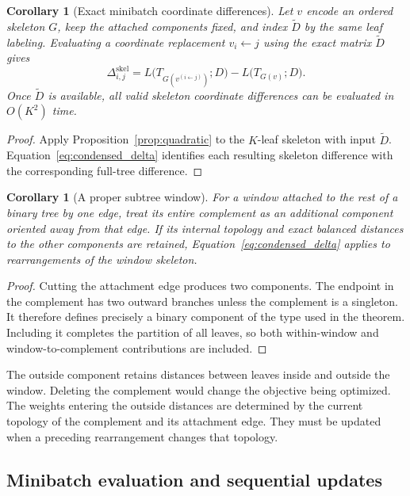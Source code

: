 \documentclass[11pt,a4paper]{article}
\makeatletter
\DeclareRobustCommand{\_}{\ifmmode\nfss@text{\textunderscore}\else\textunderscore\allowbreak\fi}
\newtheorem{corollary}[theorem]{Corollary}
\theoremstyle{definition}
\makeatother
\begin{document}
\begin{corollary}[Exact minibatch coordinate differences]
\label{cor:minibatch_gradient}
Let $v$ encode an ordered skeleton $G$, keep the attached components fixed, and index $\widetilde D$ by the same leaf labeling.
Evaluating a coordinate replacement $v_i\leftarrow j$ using the exact matrix $\widetilde D$ gives
\begin{equation}
 \Delta^{\mathrm{skel}}_{i,j}
 =L\bigl(T_{G(v^{(i\leftarrow j)})};D\bigr)
  -L\bigl(T_{G(v)};D\bigr).
 \label{eq:minibatch_gradient}
\end{equation}
Once $\widetilde D$ is available, all valid skeleton coordinate differences can be evaluated in $O(K^2)$ time.
\end{corollary}
\begin{proof}
Apply Proposition~\ref{prop:quadratic} to the $K$-leaf skeleton with input $\widetilde D$.
Equation~\eqref{eq:condensed_delta} identifies each resulting skeleton difference with the corresponding full-tree difference.
\end{proof}

\begin{corollary}[A proper subtree window]
\label{cor:outside}
For a window attached to the rest of a binary tree by one edge, treat its entire complement as an additional component oriented away from that edge.
If its internal topology and exact balanced distances to the other components are retained, Equation~\eqref{eq:condensed_delta} applies to rearrangements of the window skeleton.
\end{corollary}
\begin{proof}
Cutting the attachment edge produces two components.
The endpoint in the complement has two outward branches unless the complement is a singleton.
It therefore defines precisely a binary component of the type used in the theorem.
Including it completes the partition of all leaves, so both within-window and window-to-complement contributions are included.
\end{proof}

The outside component retains distances between leaves inside and outside the window.
Deleting the complement would change the objective being optimized.
The weights entering the outside distances are determined by the current topology of the complement and its attachment edge.
They must be updated when a preceding rearrangement changes that topology.

\subsection{Minibatch evaluation and sequential updates}
\label{sec:acceptance}
\end{document}
